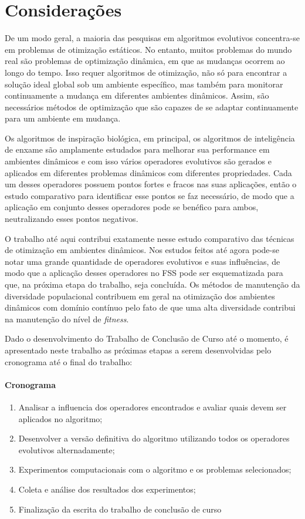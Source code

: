 \chapter{Considerações}
\label{ch:consideracoes}

De um modo geral, a maioria das pesquisas em algoritmos evolutivos concentra-se em problemas de otimização estáticos. No entanto, muitos problemas do mundo real são problemas de optimização dinâmica, em que as mudanças ocorrem ao longo do tempo. Isso requer algoritmos de otimização, não só para encontrar a solução ideal global sob um ambiente específico, mas também para monitorar continuamente a mudança em diferentes ambientes dinâmicos. Assim, são necessários métodos de optimização que são capazes de se adaptar continuamente para um ambiente em mudança.

Os algoritmos de inspiração biológica, em principal, os algoritmos de inteligência de enxame são amplamente estudados para melhorar sua performance em ambientes dinâmicos e com isso vários operadores evolutivos são gerados e aplicados em diferentes problemas dinâmicos com diferentes propriedades. Cada um desses operadores possuem pontos fortes e fracos nas suas aplicações, então o estudo comparativo para identificar esse pontos se faz necessário, de modo que a aplicação em conjunto desses operadores pode se benéfico para ambos, neutralizando esses pontos negativos.

O trabalho até aqui contribui exatamente nesse estudo comparativo das técnicas de otimização em ambientes dinâmicos. Nos estudos feitos até agora pode-se notar uma grande quantidade de operadores evolutivos e suas influências, de modo que a aplicação desses operadores no FSS pode ser esquematizada para que, na próxima etapa do trabalho, seja concluída. Os métodos de manutenção da diversidade populacional contribuem em geral na otimização dos ambientes dinâmicos com domínio contínuo pelo fato de que uma alta diversidade contribui na manutenção do nível de \textit{fitness}.

Dado o desenvolvimento do Trabalho de Conclusão de Curso até o momento, é apresentado neste trabalho as próximas etapas a serem desenvolvidas pelo cronograma até o final do trabalho:

\subsubsection{Cronograma}
\label{sec:cronograma}

\begin{enumerate}
\item Analisar a influencia dos operadores encontrados e avaliar quais devem ser aplicados no algoritmo;
\item Desenvolver a versão definitiva do algoritmo utilizando todos os operadores evolutivos alternadamente;
\item Experimentos computacionais com o algoritmo e os problemas selecionados;
\item Coleta e análise dos resultados dos experimentos; 
\item Finalização da escrita do trabalho de conclusão de curso
\end{enumerate}

